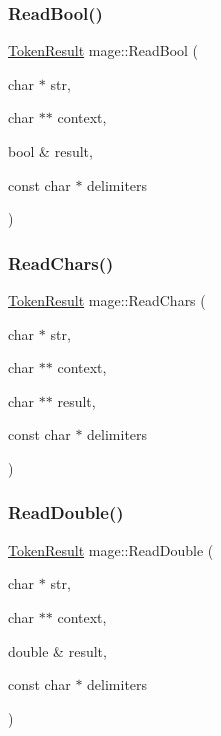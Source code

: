 \subsubsection{\texorpdfstring{Read\+Bool()}{ReadBool()}}
{\footnotesize\ttfamily \hyperlink{namespacemage_a2178ba2411db5912f41b2e7698c2037d}{Token\+Result} mage\+::\+Read\+Bool (\begin{DoxyParamCaption}\item[{char $\ast$}]{str,  }\item[{char $\ast$$\ast$}]{context,  }\item[{bool \&}]{result,  }\item[{const char $\ast$}]{delimiters }\end{DoxyParamCaption})}

\hypertarget{namespacemage_a5f2717cd5b7cfa9a43396e628e18a5d0}{}\label{namespacemage_a5f2717cd5b7cfa9a43396e628e18a5d0} 
\subsubsection{\texorpdfstring{Read\+Chars()}{ReadChars()}}
{\footnotesize\ttfamily \hyperlink{namespacemage_a2178ba2411db5912f41b2e7698c2037d}{Token\+Result} mage\+::\+Read\+Chars (\begin{DoxyParamCaption}\item[{char $\ast$}]{str,  }\item[{char $\ast$$\ast$}]{context,  }\item[{char $\ast$$\ast$}]{result,  }\item[{const char $\ast$}]{delimiters }\end{DoxyParamCaption})}

\hypertarget{namespacemage_a7ea0807bd21210be516463c68be91cb8}{}\label{namespacemage_a7ea0807bd21210be516463c68be91cb8} 
\subsubsection{\texorpdfstring{Read\+Double()}{ReadDouble()}}
{\footnotesize\ttfamily \hyperlink{namespacemage_a2178ba2411db5912f41b2e7698c2037d}{Token\+Result} mage\+::\+Read\+Double (\begin{DoxyParamCaption}\item[{char $\ast$}]{str,  }\item[{char $\ast$$\ast$}]{context,  }\item[{double \&}]{result,  }\item[{const char $\ast$}]{delimiters }\end{DoxyParamCaption})}


